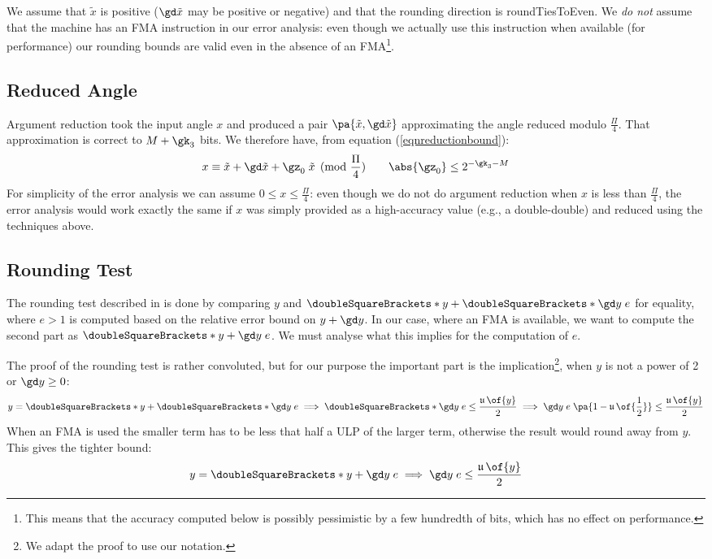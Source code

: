 \documentclass[10pt, a4paper, twoside]{basestyle}
\DeclareMathOperator{\ULP}{\mathfrak u}
\newcommand{\round}[1]{\doubleSquareBrackets*{#1}}
\newcommand{\red}[1]{\tilde{#1}}
\begin{document}
We assume that $\red x$ is positive ($\gd \red x$ may be positive or negative) and that the rounding direction is roundTiesToEven.  We \emph{do not} assume that the machine has an FMA instruction in our error analysis: even though we actually use this instruction when available (for performance) our rounding bounds are valid even in the absence of an FMA\footnote{This means that the accuracy computed below is possibly pessimistic by a few hundredth of bits, which has no effect on performance.}.

\subsection*{Reduced Angle}

Argument reduction took the input angle $x$ and produced a pair $\pa{\red x, \gd \red x}$ approximating the angle reduced modulo $\frac{\Pi}{4}$.  That approximation is correct to $M + \gk_3$ bits.  We therefore have, from equation (\ref{eqnreductionbound}):
\[
x \equiv \red x + \gd \red x + \gz_0 \; \red x \pmod{\frac{\Pi}{4}} \qquad \abs{\gz_0} \le 2^{-\gk_3 - M}
\]
For simplicity of the error analysis we can assume $0 \le x \le \frac{\Pi}{4}$: even though we do not do argument reduction when $x$ is less than $\frac{\Pi}{4}$, the error analysis would work exactly the same if $x$ was simply provided as a high-accuracy value (e.g., a double-double) and reduced using the techniques above.

\subsection*{Rounding Test}

The rounding test described in \cite[397-400]{MullerBrisebarreDeDinechinJeannerodLefevreMelquiondRevolStehleTorres2010} is done by comparing $y$ and $\round{y + \round{\gd y \; e}}$ for equality, where $e > 1$ is computed based on the relative error bound on $y + \gd y$.  In our case, where an FMA is available, we want to compute the second part as $\round{y + \gd y \; e}$.  We must analyse what this implies for the computation of $e$.

The proof of the rounding test is rather convoluted, but for our purpose the important part is the implication\footnote{We adapt the proof to use our notation.}, when $y$ is not a power of 2 or $\gd y \geq 0$:
\[
y = \round{y + \round{\gd y \; e}} \implies \round{\gd y \; e} \le \frac{\ULP\of{y}}{2} \implies \gd y \; e \; \pa{1 - \ULP\of{\frac{1}{2}}} \le \frac{\ULP\of{y}}{2}
\]
When an FMA is used the smaller term has to be less that half a ULP of the larger term, otherwise the result would round away from $y$.  This gives the tighter bound:
\[
y = \round{y + \gd y \; e} \implies \gd y \; e \le \frac{\ULP\of{y}}{2}
\]
\end{document}
